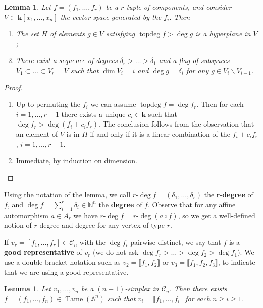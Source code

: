 \documentclass[reqno,oneside,11pt]{amsart}
\theoremstyle{plain}
\newtheorem{lemma}[theorem]{Lemma}
\theoremstyle{definition}
\newcommand{\N}{\mathbb{N}}
\newcommand{\A}{{\mathbb{A}}}
\newcommand{\K}{\mathbf{k}}
\DeclareMathOperator{\topdeg}{topdeg}
\DeclareMathOperator{\Tame}{Tame}
\newcommand{\Comp}{\mathcal{C}}
\newcommand{\llb}{\llbracket}
\newcommand{\rrb}{\rrbracket}
\renewcommand{\ge}{\geqslant}
\begin{document}
\begin{lemma} \label{lem:stratified degree}
Let $f = (f_1, \dots, f_r)$
be a $r$-tuple of components, and consider $V \subset \K[x_1, \dots, x_n]$ the vector space generated by the $f_i$.
Then
\begin{enumerate}
\item The set $H$ of elements $g \in V$ satisfying $\topdeg f > \deg g$ is a hyperplane in $V$;
\item There exist a sequence of degrees $\delta_r > \dots > \delta_1$ and a flag of subspaces $V_1 \subset \dots \subset V_r = V$ such that $\dim V_i  = i$ and $\deg g = \delta_i$ for any $g \in V_i \smallsetminus V_{i-1}$.
\end{enumerate}
\end{lemma}

\begin{proof}
\begin{enumerate}[wide]
\item
Up to permuting the $f_i$ we can assume $\topdeg f = \deg f_r$.
Then for each $i = 1, \dots, r-1$ there exists a unique $c_i \in \K$ such that
$\deg f_r > \deg (f_i + c_i f_r)$.
The conclusion follows from the observation that an element of $V$ is in $H$ if and only if it is a linear combination of the $f_i + c_i f_r$, $i = 1, \dots, r-1$.
\item
Immediate, by induction on dimension. \qedhere
\end{enumerate}
\end{proof}

Using the notation of the lemma, we call $r$-$\deg f = (\delta_1, \dots, \delta_r)$ the $\boldsymbol{r}$-\textbf{degree} of $f$, and $\deg f = \sum_{i = 1}^r \delta_i \in \N^n$ the \textbf{degree} of $f$.
Observe that for any affine automorphism $a \in A_r$ we have $r\text{-}\deg f =
r\text{-}\deg (a\circ f)$, so we get a well-defined notion of $r$-degree and
degree for any vertex of type $r$.

If $v_r = [f_1,\dots,f_r] \in \Comp_n$ with
the $\deg f_i$ pairwise distinct, we say that $f$ is a
\textbf{good representative} of $v_r$ (we do not ask $\deg f_r > \dots > \deg
f_2 > \deg f_1$).
We use a double bracket notation such as $v_2 = \llb
f_1,f_2 \rrb$ or $v_3 = \llb f_1,f_2,f_3 \rrb$, to indicate that we are using a
good representative.

\begin{lemma} \label{lem:rep of a simplex}
Let $v_1, \dots, v_n$ be a $(n-1)$-simplex in $\Comp_n$.
Then there exists $f = (f_1, \dots, f_n) \in \Tame(\A^n)$ such that
$v_i = \llb f_1, \dots, f_i \rrb$ for each $n  \ge i \ge 1$.
\end{lemma}
\end{document}
